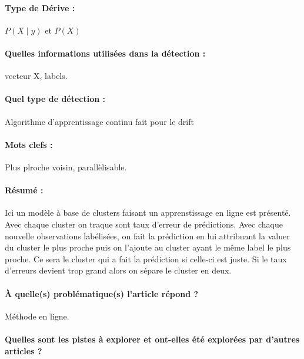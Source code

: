 \documentclass[11pt,a4paper]{report}
\begin{document}
\paragraph{Type de Dérive :} $P(X\mid y)$ et $P(X)$
\paragraph{Quelles informations utilisées dans la détection :} vecteur X, labels.
\paragraph{Quel type de détection :} Algorithme d'apprentissage continu fait pour le drift

\paragraph{Mots clefs :} Plus plroche voisin, parallèlisable.

\paragraph{Résumé :} Ici un modèle à base de clusters faisant un apprenstissage en ligne est présenté. Avec chaque cluster on traque sont taux d'erreur de prédictions. Avec chaque nouvelle observations labélisées, on fait la prédiction en lui attribuant la valuer du cluster le plus proche puis on l'ajoute au cluster ayant le même label le plus proche. Ce sera le cluster qui a fait la prédiction si celle-ci est juste. Si le taux d'erreurs devient trop grand alors on sépare le cluster en deux.

\paragraph{À quelle(s) problématique(s) l'article répond ?} Méthode en ligne.

\paragraph{Quelles sont les pistes à explorer et ont-elles  été explorées par d'autres articles ?}
\end{document}
